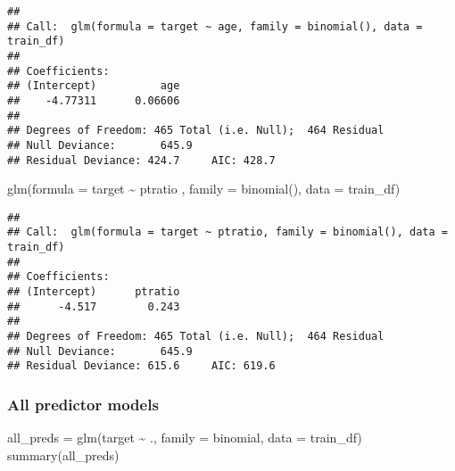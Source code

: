 \documentclass[
]{article}
\newenvironment{Shaded}{\begin{snugshade}}{\end{snugshade}}
\newcommand{\AttributeTok}[1]{\textcolor[rgb]{0.77,0.63,0.00}{#1}}
\newcommand{\FunctionTok}[1]{\textcolor[rgb]{0.00,0.00,0.00}{#1}}
\newcommand{\NormalTok}[1]{#1}
\newcommand{\OtherTok}[1]{\textcolor[rgb]{0.56,0.35,0.01}{#1}}
\newcommand{\SpecialCharTok}[1]{\textcolor[rgb]{0.00,0.00,0.00}{#1}}
\begin{document}
\begin{verbatim}
## 
## Call:  glm(formula = target ~ age, family = binomial(), data = train_df)
## 
## Coefficients:
## (Intercept)          age  
##    -4.77311      0.06606  
## 
## Degrees of Freedom: 465 Total (i.e. Null);  464 Residual
## Null Deviance:       645.9 
## Residual Deviance: 424.7     AIC: 428.7
\end{verbatim}

\begin{Shaded}
\begin{Highlighting}[]
\FunctionTok{glm}\NormalTok{(}\AttributeTok{formula =}\NormalTok{ target }\SpecialCharTok{\textasciitilde{}}\NormalTok{ ptratio , }\AttributeTok{family =} \FunctionTok{binomial}\NormalTok{(), }\AttributeTok{data =}\NormalTok{ train\_df)}
\end{Highlighting}
\end{Shaded}

\begin{verbatim}
## 
## Call:  glm(formula = target ~ ptratio, family = binomial(), data = train_df)
## 
## Coefficients:
## (Intercept)      ptratio  
##      -4.517        0.243  
## 
## Degrees of Freedom: 465 Total (i.e. Null);  464 Residual
## Null Deviance:       645.9 
## Residual Deviance: 615.6     AIC: 619.6
\end{verbatim}

\hypertarget{all-predictor-models}{%
\subsubsection{All predictor models}\label{all-predictor-models}}

\begin{Shaded}
\begin{Highlighting}[]
\NormalTok{all\_preds }\OtherTok{=} \FunctionTok{glm}\NormalTok{(target }\SpecialCharTok{\textasciitilde{}}\NormalTok{ ., }\AttributeTok{family =}\NormalTok{ binomial, }\AttributeTok{data =}\NormalTok{ train\_df)}
\FunctionTok{summary}\NormalTok{(all\_preds)}
\end{Highlighting}
\end{Shaded}
\end{document}
